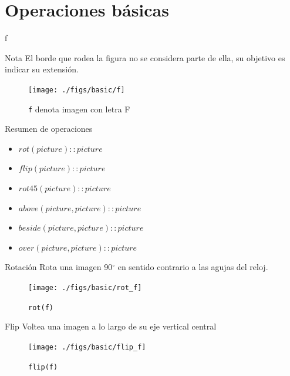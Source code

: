 \documentclass{beamer}
\begin{document}
    \section{Operaciones básicas}

    \begin{frame}{f}
        \begin{alertblock}{Nota}
        El borde que rodea la figura no se considera parte de ella, su objetivo es indicar su extensión.
        \end{alertblock}

        \begin{figure}
            \centering
            \texttt{[image: ./figs/basic/f]}
            \caption{\texttt{f} denota imagen con letra F}
            \label{fig:f}
        \end{figure}

    \end{frame}

    \begin{frame}{Resumen de operaciones}

        \begin{itemize}
            \item $rot(picture) :: picture$
            \item $flip(picture) :: picture$
            \item $rot45(picture) :: picture$
            \item $above(picture, picture) :: picture$
            \item $beside(picture, picture) :: picture$
            \item $over(picture, picture) :: picture$
        \end{itemize}

    \end{frame}

    \begin{frame}{Rotación}
        Rota una imagen 90$^{\circ}$ en sentido contrario a las agujas del reloj.

        \begin{figure}
            \centering
            \texttt{[image: ./figs/basic/rot\_f]}
            \caption{\texttt{rot(f)}}
            \label{fig:rot_f}
        \end{figure}
    \end{frame}

    \begin{frame}{Flip}
        Voltea una imagen a lo largo de su eje vertical central

        \begin{figure}
            \centering
            \texttt{[image: ./figs/basic/flip\_f]}
            \caption{\texttt{flip(f)}}
            \label{fig:flip_f}
        \end{figure}
    \end{frame}
\end{document}
